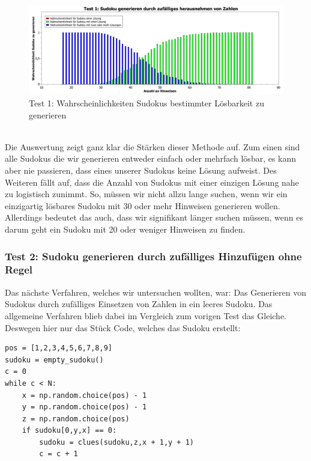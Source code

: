 \documentclass[11pt,a4paper]{article}
\begin{document}
\ \\
\begin{figure}[htbp!]
\begin{center}
\includegraphics[width=1\textwidth]{Test1ABB.pdf}
\end{center}
\caption{Test 1: Wahrscheinlichkeiten Sudokus bestimmter Lösbarkeit zu generieren}
\end{figure}
\ \\ 
Die Auswertung zeigt ganz klar die Stärken dieser Methode auf. Zum einen sind alle Sudokus die wir generieren entweder einfach oder mehrfach lösbar, es kann aber nie passieren, dass eines unserer Sudokus keine Lösung aufweist. Des Weiteren fällt auf, dass die Anzahl von Sudokus mit einer einzigen Lösung nahe zu logistisch zunimmt. So, müssen wir nicht allzu lange suchen, wenn wir ein einzigartig lösbares Sudoku mit 30 oder mehr Hinweisen generieren wollen.
Allerdings bedeutet das auch, dass wir signifikant länger suchen müssen, wenn es darum geht ein Sudoku mit 20 oder weniger Hinweisen zu finden.

\newpage
\subsubsection{Test 2: Sudoku generieren durch zufälliges Hinzufügen ohne Regel}
Das nächste Verfahren, welches wir untersuchen wollten, war: Das Generieren von Sudokus durch zufälliges Einsetzen von Zahlen in ein leeres Sudoku. Das allgemeine Verfahren blieb dabei im Vergleich zum vorigen Test das Gleiche. Deswegen hier nur das Stück Code, welches das Sudoku erstellt:
\ \\
\begin{verbatim}                     
pos = [1,2,3,4,5,6,7,8,9]             
sudoku = empty_sudoku()       
c = 0                         
while c < N:                                     
    x = np.random.choice(pos) - 1                
    y = np.random.choice(pos) - 1                
    z = np.random.choice(pos)                    
    if sudoku[0,y,x] == 0:                       
        sudoku = clues(sudoku,z,x + 1,y + 1)     
        c = c + 1                                 
\end{verbatim}
\ \\
\end{document}
